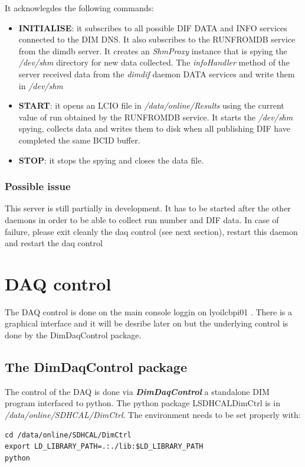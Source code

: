 \documentclass[english]{article}
\begin{document}
 It acknowlegdes the following commands:
 \begin{itemize}
\item {\bf INITIALISE}: it subscribes to all possible DIF DATA and INFO services connected to the DIM DNS. It also subscribes to the RUNFROMDB service from the dimdb server. It creates an {\sl ShmProxy} instance that is spying the {\sl /dev/shm} directory for new data collected. The {\sl infoHandler} method of the server received data from the {\sl dimdif} daemon DATA services and write them in {\sl /dev/shm}
\item {\bf START}: it opens an LCIO file in {\sl /data/online/Results} using the current value of run obtained by the RUNFROMDB service. It starts the {\sl /dev/shm} spying, collects data and writes them to disk when all publishing DIF have completed the same BCID buffer.
\item {\bf STOP}: it stops the spying and closes the data file.
\end{itemize}

\subsubsection{Possible issue}

This server is still partially in development. It has to be started after the other daemons in order to be able
to collect run number and DIF data. In case of failure, please exit cleanly the daq control (see next section), restart this daemon and restart the daq control   

\section {DAQ control}

The DAQ control is done on the main console loggin on lyoilcbpi01 . There is a graphical interface and it will be desribe later on but the underlying control is done by the DimDaqControl package.

\subsection{ The DimDaqControl package }
The control of the DAQ is done via { \bf \sl DimDaqControl } a standalone DIM program interfaced to python. The python package LSDHCALDimCtrl  is in {\sl /data/online/SDHCAL/DimCtrl}. The environment needs to be set properly with:

\begin{verbatim}
cd /data/online/SDHCAL/DimCtrl
export LD_LIBRARY_PATH=.:./lib:$LD_LIBRARY_PATH
python
\end{verbatim}  
\end{document}
